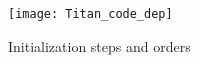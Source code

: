 \begin{figure}
\centering
\texttt{[image: Titan\_code\_dep]}
\caption{\label{Titan_code_dep}Initialization steps and orders}
\end{figure}
